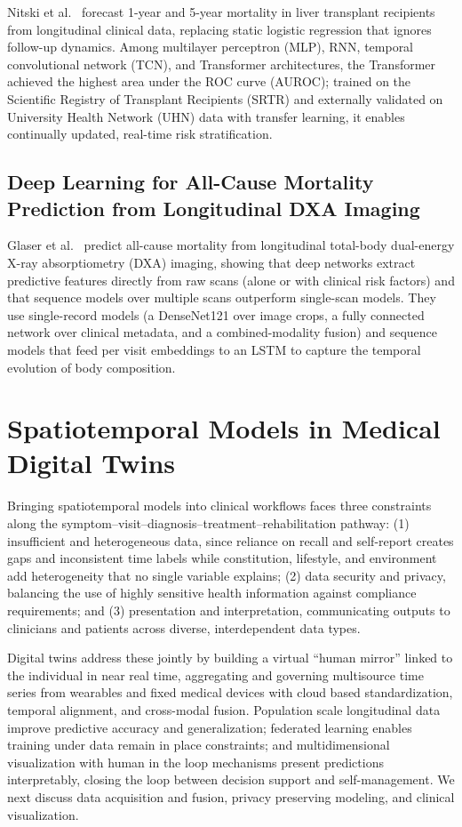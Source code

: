 \documentclass[journal]{IEEEtran}
\begin{document}
Nitski et al.~\cite{nitski2021long} forecast 1-year and 5-year mortality in liver transplant recipients from longitudinal clinical data, replacing static logistic regression that ignores follow-up dynamics. Among multilayer perceptron (MLP), RNN, temporal convolutional network (TCN), and Transformer architectures, the Transformer achieved the highest area under the ROC curve (AUROC); trained on the Scientific Registry of Transplant Recipients (SRTR) and externally validated on University Health Network (UHN) data with transfer learning, it enables continually updated, real-time risk stratification.


\subsection{Deep Learning for All-Cause Mortality Prediction from Longitudinal DXA Imaging}

Glaser et al.~\cite{glaser2022deep} predict all-cause mortality from longitudinal total-body dual-energy X-ray absorptiometry (DXA) imaging, showing that deep networks extract predictive features directly from raw scans (alone or with clinical risk factors) and that sequence models over multiple scans outperform single-scan models. They use single-record models (a DenseNet121 over image crops, a fully connected network over clinical metadata, and a combined-modality fusion) and sequence models that feed per visit embeddings to an LSTM to capture the temporal evolution of body composition.


\section{Spatiotemporal Models in Medical Digital Twins}
\label{sec:DT}
Bringing spatiotemporal models into clinical workflows faces three constraints along the symptom--visit--diagnosis--treatment--rehabilitation pathway: (1) insufficient and heterogeneous data, since reliance on recall and self-report creates gaps and inconsistent time labels while constitution, lifestyle, and environment add heterogeneity that no single variable explains; (2) data security and privacy, balancing the use of highly sensitive health information against compliance requirements; and (3) presentation and interpretation, communicating outputs to clinicians and patients across diverse, interdependent data types.

Digital twins address these jointly by building a virtual ``human mirror'' linked to the individual in near real time, aggregating and governing multisource time series from wearables and fixed medical devices with cloud based standardization, temporal alignment, and cross-modal fusion. Population scale longitudinal data improve predictive accuracy and generalization; federated learning enables training under data remain in place constraints; and multidimensional visualization with human in the loop mechanisms present predictions interpretably, closing the loop between decision support and self-management. We next discuss data acquisition and fusion, privacy preserving modeling, and clinical visualization.
\end{document}
